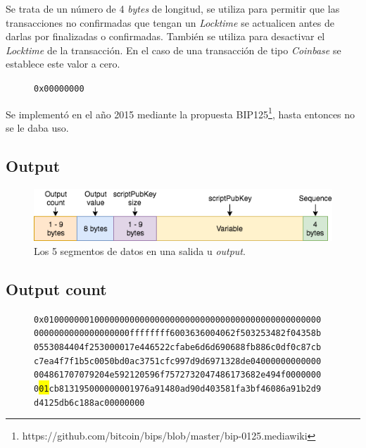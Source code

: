 \documentclass{article}
\begin{document}
    Se trata de un número de 4 \textit{bytes} de longitud, se utiliza para permitir que las transacciones no confirmadas que tengan un \textit{Locktime} se actualicen antes de darlas por finalizadas o confirmadas. También se utiliza para desactivar el \textit{Locktime} de la transacción. En el caso de una transacción de tipo \textit{Coinbase} se establece este valor a cero.
    \begin{figure}[H]
        \texttt{0x00000000}
    \end{figure}
    Se implementó en el año 2015 mediante la propuesta BIP125\footnote{https://github.com/bitcoin/bips/blob/master/bip-0125.mediawiki}, hasta entonces no se le daba uso.
    
    \subsection{Output}
    
    \begin{figure}[H]
    \centering
        \includegraphics[scale=0.57]{img/Bitcoin_transactions_data_output.png}
        \caption{Los 5 segmentos de datos en una salida u \textit{output}.}
    \end{figure}
    
    \subsection{Output count}
    
    \begin{figure}[H]
        \texttt{0x0100000001000000000000000000000000000000000000000000000} \\
        \texttt{0000000000000000000ffffffff6003636004062f503253482f04358b} \\
        \texttt{0553084404f253000017e446522cfabe6d6d690688fb886c0df0c87cb} \\
        \texttt{c7ea4f7f1b5c0050bd0ac3751cfc997d9d6971328de04000000000000} \\
        \texttt{004861707079204e592120596f7572732047486173682e494f0000000} \\
        \texttt{0\colorbox{Yellow}{01}cb813195000000001976a91480ad90d403581fa3bf46086a91b2d9} \\
        \texttt{d4125db6c188ac00000000}
    \end{figure}
    
\end{document}
